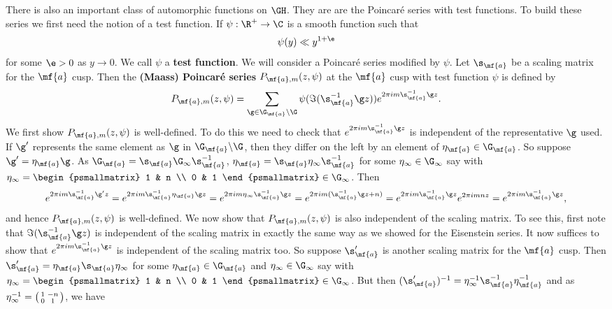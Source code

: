     There is also an important class of automorphic functions on $\GH$. They are are the Poincar\'e series with test functions. To build these series we first need the notion of a test function. If $\psi:\R^{+} \to \C$ is a smooth function such that
    \[
      \psi(y) \ll y^{1+\e}
    \]
    for some $\e > 0$ as $y \to 0$. We call $\psi$ a \textbf{test function}. We will consider a Poincar\'e series modified by $\psi$. Let $\s_{\mf{a}}$ be a scaling matrix for the $\mf{a}$ cusp. Then the \textbf{(Maass) Poincar\'e series} $P_{\mf{a},m}(z,\psi)$ at the $\mf{a}$ cusp with test function $\psi$ is defined by
    \[
      P_{\mf{a},m}(z,\psi) = \sum_{\g \in \G_{\mf{a}}\backslash\G}\psi(\Im(\s_{\mf{a}}^{-1}\g z))e^{2\pi im\s_{\mf{a}}^{-1}\g z}.
    \]
    We first show $P_{\mf{a},m}(z,\psi)$ is well-defined. To do this we need to check that $e^{2\pi im\s_{\mf{a}}^{-1}\g z}$ is independent of the representative $\g$ used. If $\g'$ represents the same element as $\g$ in $\G_{\mf{a}}\backslash\G$, then they differ on the left by an element of $\eta_{\mf{a}} \in \G_{\mf{a}}$. So suppose $\g' = \eta_{\mf{a}}\g$. As $\G_{\mf{a}} = \s_{\mf{a}}\G_{\infty}\s_{\mf{a}}^{-1}$, $\eta_{\mf{a}} = \s_{\mf{a}}\eta_{\infty}\s_{\mf{a}}^{-1}$ for some $\eta_{\infty} \in \G_{\infty}$ say with $\eta_{\infty} = \begin{psmallmatrix} 1 & n \\ 0 & 1 \end{psmallmatrix} \in \G_{\infty}$. Then
    \[
      e^{2\pi im\s_{\mf{a}}^{-1}\g' z} = e^{2\pi im\s_{\mf{a}}^{-1}\eta_{\mf{a}}\g z} = e^{2\pi im\eta_{\infty}\s_{\mf{a}}^{-1}\g z} = e^{2\pi im(\s_{\mf{a}}^{-1}\g z+n)} = e^{2\pi im\s_{\mf{a}}^{-1}\g z}e^{2\pi imnz} = e^{2\pi im\s_{\mf{a}}^{-1}\g z},
    \]
    and hence $P_{\mf{a},m}(z,\psi)$ is well-defined. We now show that $P_{\mf{a},m}(z,\psi)$ is also independent of the scaling matrix. To see this, first note that $\Im(\s_{\mf{a}}^{-1}\g z)$ is independent of the scaling matrix in exactly the same way as we showed for the Eisenstein series. It now suffices to show that $e^{2\pi im\s_{\mf{a}}^{-1}\g z}$ is independent of the scaling matrix too. So suppose $\s_{\mf{a}}'$ is another scaling matrix for the $\mf{a}$ cusp. Then $\s_{\mf{a}}' = \eta_{\mf{a}}\s_{\mf{a}}\eta_{\infty}$ for some $\eta_{\mf{a}} \in \G_{\mf{a}}$ and $\eta_{\infty} \in \G_{\infty}$ say with $\eta_{\infty} = \begin{psmallmatrix} 1 & n \\ 0 & 1 \end{psmallmatrix} \in \G_{\infty}$. But then $(\s_{\mf{a}}')^{-1} = \eta_{\infty}^{-1}\s_{\mf{a}}^{-1}\eta_{\mf{a}}^{-1}$ and as $\eta_{\infty}^{-1} = \begin{psmallmatrix} 1 & -n \\ 0 & 1 \end{psmallmatrix}$, we have
